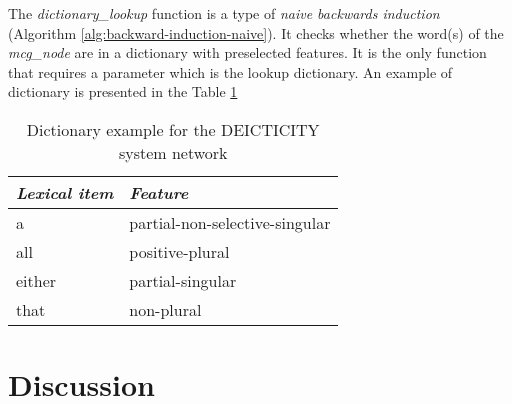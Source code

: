The \textit{dictionary\_lookup} function is a type of \textit{naive backwards induction} (Algorithm \ref{alg:backward-induction-naive}). It checks whether the word(s) of the \textit{mcg\_node} are in a dictionary with preselected features. It is the only function that requires a parameter which is the lookup dictionary. An example of dictionary is presented in the Table \ref{tab:lookup-dict-example}

\begin{table}[!ht]
	\centering
	\begin{tabular}{|l|l|}
		\hline
		\textit{Lexical item} & \textit{Feature}               \\ \hline
		a                     & partial-non-selective-singular \\ \hline
		all                   & positive-plural                \\ \hline
		either                & partial-singular               \\ \hline
		that                  & non-plural                     \\ \hline
	\end{tabular}
	\caption{Dictionary example for the DEICTICITY system network}
	\label{tab:lookup-dict-example}
\end{table}

\section{Discussion}



